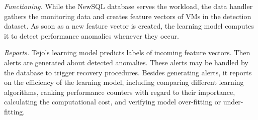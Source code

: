 \emph{Functioning.} While the NewSQL database serves the workload, the data handler gathers the monitoring data and creates feature vectors of VMs in the detection dataset. As soon as a new feature vector is created, the learning model computes it to detect performance anomalies whenever they occur.  

\emph{Reports.} Tejo's learning model predicts labels of incoming feature vectors. Then alerts are generated about detected anomalies. These alerts may be handled by the database to trigger recovery procedures. Besides generating alerts, it reports on the efficiency of the learning model, including comparing different learning algorithms, ranking performance counters with regard to their importance, calculating the computational cost, and verifying model over-fitting  or under-fitting. 


